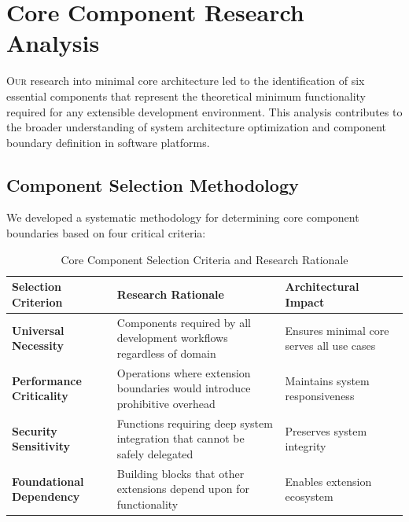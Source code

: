 
\section*{Core Component Research Analysis}

\lettrine{O}{ur} research into minimal core architecture led to the identification of six essential components that represent the theoretical minimum functionality required for any extensible development environment. This analysis contributes to the broader understanding of system architecture optimization and component boundary definition in software platforms.

\vspace{0.5cm}
\subsection*{Component Selection Methodology}

We developed a systematic methodology for determining core component boundaries based on four critical criteria:

\begin{table}[ht]
\centering
\begin{tabular}{@{}p{}p{}p{}@{}}
\toprule
\textbf{Selection Criterion} & \textbf{Research Rationale} & \textbf{Architectural Impact} \\
\midrule
\textbf{Universal Necessity} & 
Components required by all development workflows regardless of domain & 
Ensures minimal core serves all use cases \\
\midrule
\textbf{Performance Criticality} & 
Operations where extension boundaries would introduce prohibitive overhead & 
Maintains system responsiveness \\
\midrule
\textbf{Security Sensitivity} & 
Functions requiring deep system integration that cannot be safely delegated & 
Preserves system integrity \\
\midrule
\textbf{Foundational Dependency} & 
Building blocks that other extensions depend upon for functionality & 
Enables extension ecosystem \\
\bottomrule
\end{tabular}
\caption{Core Component Selection Criteria and Research Rationale}
\end{table}

